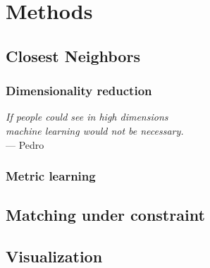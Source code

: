 \chapter{Methods}
\label{chap:methods}

\section{Closest Neighbors}

\subsection{Dimensionality reduction}

\begin{flushright}{\slshape
	If people could see in high dimensions \\
	machine learning would not be necessary.
} \\ \medskip
--- Pedro \Textcite{MLKnowledge12}
\end{flushright}

\subsection{Metric learning}

\section{Matching under constraint}

\section{Visualization}
